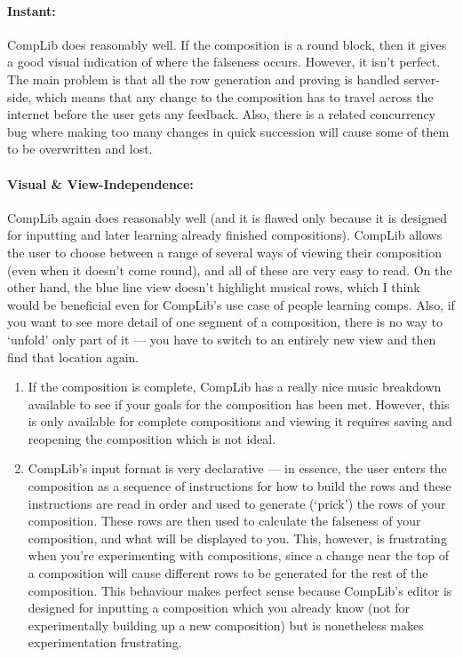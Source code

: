 \documentclass[12pt]{article}
\begin{document}
\paragraph{Instant:}  CompLib does reasonably well.  If the composition is a round block, then it
gives a good visual indication of where the falseness occurs.  However, it isn't perfect.  The main
problem is that all the row generation and proving is handled server-side, which means that any
change to the composition has to travel across the internet before the user gets any feedback.
Also, there is a related concurrency bug where making too many changes in quick succession will
cause some of them to be overwritten and lost.

\paragraph{Visual \& View-Independence:}  CompLib again does reasonably well (and it is flawed only
because it is designed for inputting and later learning already finished compositions).
CompLib allows the user to choose between a range of several ways of viewing their composition (even
when it doesn't come round), and all of these are very easy to read.  On the other hand, the
blue line view doesn't highlight musical rows, which I think would be beneficial even for CompLib's
use case of people learning comps.  Also, if you want to see more detail of one segment of a
composition, there is no way to `unfold' only part of it --- you have to switch to an entirely new
view and then find that location again.

\begin{enumerate}
    \item If the composition is complete, CompLib has a really nice music breakdown available to see
        if your goals for the composition has been met.  However, this is only available for
        complete compositions and viewing it requires saving and reopening the composition which is
        not ideal.
    \item CompLib's input format is very declarative --- in essence, the user enters the composition
        as a sequence of instructions for how to build the rows and these instructions are read
        in order and used to generate (`prick') the rows of your composition.  These rows are then
        used to calculate the falseness of your composition, and what will be displayed to you.
        This, however, is frustrating when you're experimenting with compositions, since a change
        near the top of a composition will cause different rows to be generated for the rest of the
        composition.  This behaviour makes perfect sense because CompLib's editor is designed for
        inputting a composition which you already know (not for experimentally building up a new
        composition) but is nonetheless makes experimentation frustrating.
\end{enumerate}
\end{document}
